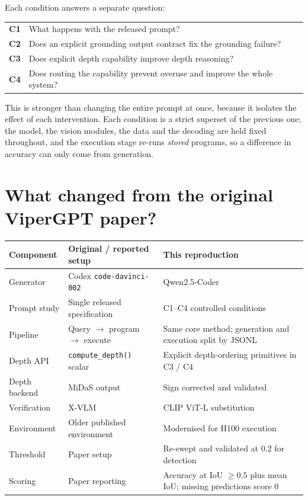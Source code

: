 \documentclass[11pt,a4paper]{article}
\begin{document}
Each condition answers a separate question:

\begin{center}
\begin{tabular}{@{}lp{}@{}}
\toprule
\textbf{C1} & What happens with the released prompt? \\
\textbf{C2} & Does an explicit grounding output contract fix the grounding failure? \\
\textbf{C3} & Does explicit depth capability improve depth reasoning? \\
\textbf{C4} & Does routing the capability prevent overuse and improve the whole system? \\
\bottomrule
\end{tabular}
\end{center}

This is stronger than changing the entire prompt at once, because it isolates the
effect of each intervention. Each condition is a strict superset of the previous one;
the model, the vision modules, the data and the decoding are held fixed throughout, and
the execution stage re-runs \emph{stored} programs, so a difference in accuracy can
only come from generation.

\section{What changed from the original ViperGPT paper?}

\begin{center}
\begin{tabular}{@{}p{}p{}p{}@{}}
\toprule
\textbf{Component} & \textbf{Original / reported setup} & \textbf{This reproduction} \\
\midrule
Generator      & Codex \texttt{code-davinci-002} & Qwen2.5-Coder \\
Prompt study   & Single released specification & C1--C4 controlled conditions \\
Pipeline       & Query $\rightarrow$ program $\rightarrow$ execute &
                 Same core method; generation and execution split by JSONL \\
Depth API      & \texttt{compute\_depth()} scalar &
                 Explicit depth-ordering primitives in C3 / C4 \\
Depth backend  & MiDaS output & Sign corrected and validated \\
Verification   & X-VLM & CLIP ViT-L substitution \\
Environment    & Older published environment & Modernised for H100 execution \\
Threshold      & Paper setup & Re-swept and validated at $0.2$ for detection \\
Scoring        & Paper reporting &
                 Accuracy at IoU $\geq 0.5$ plus mean IoU; missing predictions score 0 \\
\bottomrule
\end{tabular}
\end{center}
\end{document}
